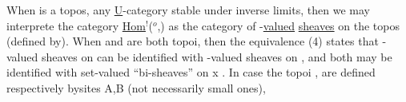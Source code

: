  When  is a topos,  any \uline{U}-category stable under inverse limits,
then we may interprete the category \uline{Hom}$^{!}$($^{o}$,) as the category of
-\uline{valued} \uline{sheaves} on the topos (defined by). When  and  are both
topoi, then the equivalence (4) states that  -valued sheaves on
 can be identified with -valued sheaves on , and both may be
identified with set-valued ``bi-sheaves'' on  x . In case the topoi
, are defined respectively bysites A,B (not necessarily small ones),

